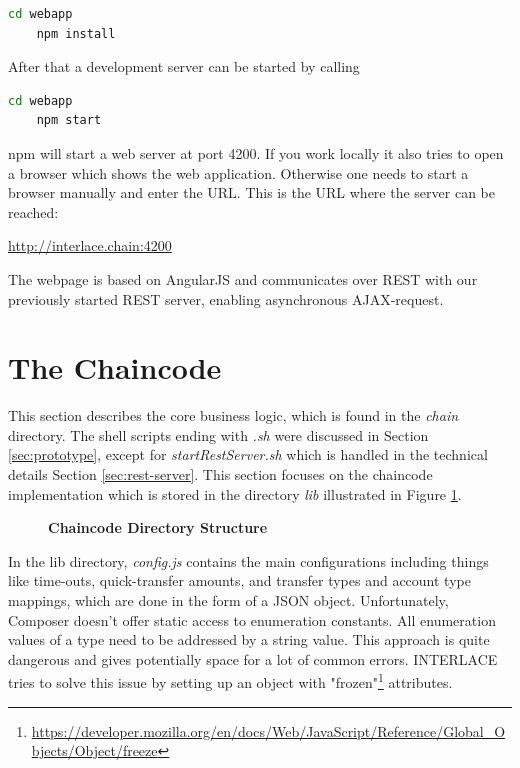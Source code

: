 \begin{lstlisting}[language=bash]
	cd webapp
	npm install
\end{lstlisting}

After that a development server can be started by calling

\begin{lstlisting}[language=bash]
	cd webapp
	npm start
\end{lstlisting}

npm will start a web server at port 4200. If you work locally it also tries to open a browser which shows the web application. Otherwise one needs to start a browser manually and enter the URL. This is the URL where the server can be reached:

\url{http://interlace.chain:4200}

The webpage is based on AngularJS and communicates over REST with our previously started REST server, enabling asynchronous AJAX-request.

\section{The Chaincode}
\label{sec:chaincode}

This section describes the core business logic, which is found in the \textit{chain} directory. The shell scripts ending with \textit{.sh} were discussed in Section \ref{sec:prototype}, except for \textit{startRestServer.sh} which is handled in the technical details Section \ref{sec:rest-server}. This section focuses on the chaincode implementation which is stored in the directory \textit{lib} illustrated in Figure \ref{fig:chain-structure}.

\begin{figure}[htbp]
\centering
\begin{minipage}{5cm}
\end{minipage}
\caption{\bf\small Chaincode Directory Structure}
\label{fig:chain-structure}
\end{figure}


In the lib directory, \textit{config.js} contains the main configurations including things like time-outs, quick-transfer amounts, and transfer types and account type mappings, which are done in the form of a JSON object. Unfortunately, Composer doesn't offer static access to enumeration constants. All enumeration values of a type need to be addressed by a string value. This approach is quite dangerous and gives potentially space for a lot of common errors. INTERLACE tries to solve this issue by setting up an object with "frozen"\footnote{\url{https://developer.mozilla.org/en/docs/Web/JavaScript/Reference/Global_Objects/Object/freeze}} attributes.

